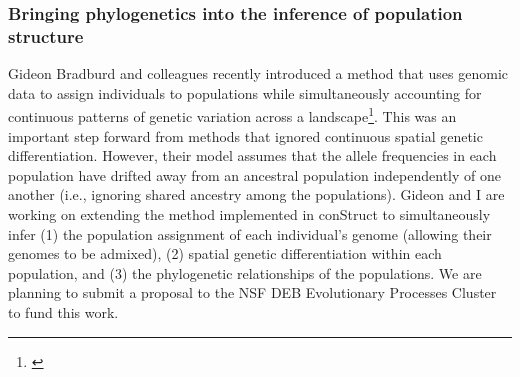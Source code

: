 


\subsubsection*{Bringing phylogenetics into the inference of population structure}
Gideon Bradburd and colleagues recently introduced a method that uses genomic
data to assign individuals to populations while simultaneously accounting for
continuous patterns of genetic variation across a
landscape\footnote{\label{Bradburd18}\hspace{-0.8em}}.
This was an important step forward from methods that ignored continuous spatial
genetic differentiation.
However, their model assumes that the allele frequencies in each population
have drifted away from an ancestral population independently of one another
(i.e., ignoring shared ancestry among the populations).
Gideon and I are working on extending the method implemented in conStruct
to simultaneously infer
(1) the population assignment of each individual's genome (allowing their
genomes to be admixed),
(2) spatial genetic differentiation within each population, and
(3) the phylogenetic relationships of the populations.
We are planning to submit a proposal to the NSF DEB
Evolutionary Processes Cluster
to fund this work.



